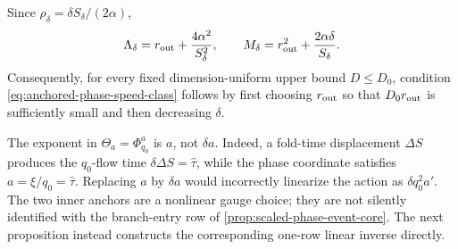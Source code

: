 \begin{lemma}
Since \(\rho_\delta=\delta S_\delta/(2\alpha)\),
\begin{equation}
 \Lambda_\delta=r_{\rm out}+\frac{4\alpha^2}{S_\delta^2},
 \qquad
 M_\delta=r_{\rm out}^2+\frac{2\alpha\delta}{S_\delta}.       \label{eq:anchored-phase-small-parameters}
\end{equation}
Consequently, for every fixed dimension-uniform upper bound
\(D\le D_0\), condition
\cref{eq:anchored-phase-speed-class} follows by first choosing
\(r_{\rm out}\) so that \(D_0r_{\rm out}\) is sufficiently small and
then decreasing \(\delta\).
\end{lemma}

The exponent in \(\Theta_a=\Phi_{q_0}^{a}\) is \(a\), not
\(\delta a\).  Indeed, a fold-time displacement \(\Delta S\) produces the
\(q_0\)-flow time \(\delta\Delta S=\widehat\tau\), while the phase
coordinate satisfies \(a=\xi/q_0=\widehat\tau\).  Replacing \(a\) by
\(\delta a\) would incorrectly linearize the action as
\(\delta q_0^2a'\).  The two inner anchors are a nonlinear gauge choice;
they are not silently identified with the branch-entry row of
\cref{prop:scaled-phase-event-core}.  The next proposition instead
constructs the corresponding one-row linear inverse directly.

